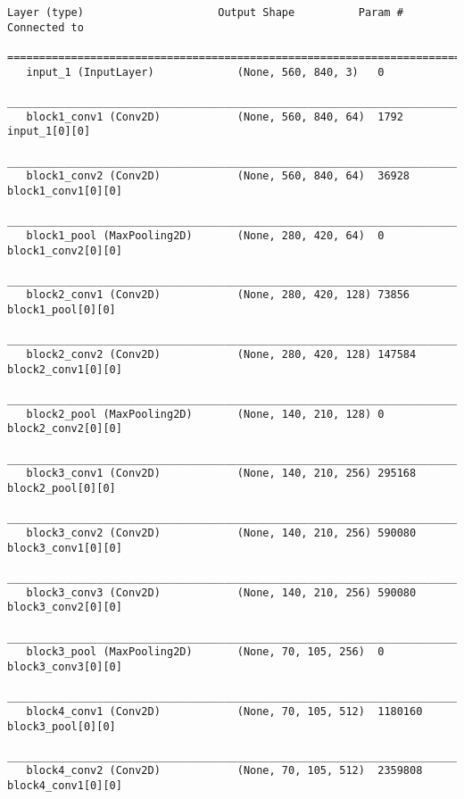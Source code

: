 \begin{Verbatim}[fontsize=\scriptsize]
   Layer (type)                     Output Shape          Param #     Connected to                     
   =======================================================================================
   input_1 (InputLayer)             (None, 560, 840, 3)   0                                            
   _______________________________________________________________________________________
   block1_conv1 (Conv2D)            (None, 560, 840, 64)  1792        input_1[0][0]                    
   _______________________________________________________________________________________
   block1_conv2 (Conv2D)            (None, 560, 840, 64)  36928       block1_conv1[0][0]               
   _______________________________________________________________________________________
   block1_pool (MaxPooling2D)       (None, 280, 420, 64)  0           block1_conv2[0][0]               
   _______________________________________________________________________________________
   block2_conv1 (Conv2D)            (None, 280, 420, 128) 73856       block1_pool[0][0]                
   _______________________________________________________________________________________
   block2_conv2 (Conv2D)            (None, 280, 420, 128) 147584      block2_conv1[0][0]               
   _______________________________________________________________________________________
   block2_pool (MaxPooling2D)       (None, 140, 210, 128) 0           block2_conv2[0][0]               
   _______________________________________________________________________________________
   block3_conv1 (Conv2D)            (None, 140, 210, 256) 295168      block2_pool[0][0]                
   _______________________________________________________________________________________
   block3_conv2 (Conv2D)            (None, 140, 210, 256) 590080      block3_conv1[0][0]               
   _______________________________________________________________________________________
   block3_conv3 (Conv2D)            (None, 140, 210, 256) 590080      block3_conv2[0][0]               
   _______________________________________________________________________________________
   block3_pool (MaxPooling2D)       (None, 70, 105, 256)  0           block3_conv3[0][0]               
   _______________________________________________________________________________________
   block4_conv1 (Conv2D)            (None, 70, 105, 512)  1180160     block3_pool[0][0]                
   _______________________________________________________________________________________
   block4_conv2 (Conv2D)            (None, 70, 105, 512)  2359808     block4_conv1[0][0]               

\end{Verbatim}
